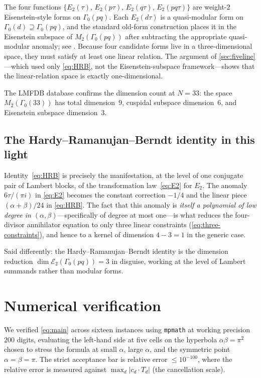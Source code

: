 \documentclass[11pt,reqno]{amsart}
\theoremstyle{definition}
\newcommand{\Eis}{\mathcal{E}}
\begin{document}
The four functions $\{E_2(\tau),\, E_2(p\tau),\, E_2(q\tau),\,
E_2(pq\tau)\}$ are weight-$2$ Eisenstein-style forms on
$\Gamma_0(pq)$. Each $E_2(d\tau)$ is a quasi-modular form on
$\Gamma_0(d) \supseteq \Gamma_0(pq)$, and the standard old-form
construction places it in the Eisenstein subspace of
$M_2(\Gamma_0(pq))$ after subtracting the appropriate quasi-modular
anomaly; see \cite[\S5.6]{DiamondShurman}. Because four candidate
forms live in a three-dimensional space, they must satisfy at least
one linear relation. The argument of \cref{sec:fiveline}---which used
only \cref{eq:HRB}, not the Eisenstein-subspace framework---shows
that the linear-relation space is exactly one-dimensional.

The LMFDB database \cite{LMFDB} confirms the dimension count at
$N = 33$: the space $M_2(\Gamma_0(33))$ has total dimension~$9$,
cuspidal subspace dimension~$6$, and Eisenstein subspace dimension~$3$.

\subsection{The Hardy--Ramanujan--Berndt identity in this light}

Identity~\eqref{eq:HRB} is precisely the manifestation, at the level
of one conjugate pair of Lambert blocks, of the transformation
law~\eqref{eq:E2} for $E_2$. The anomaly $6\tau/(\pi i)$ in
\cref{eq:E2} becomes the constant correction $-1/4$ and the linear
piece $(\alpha + \beta)/24$ in \cref{eq:HRB}. The fact that this
anomaly is \emph{itself a polynomial of low degree in
$(\alpha, \beta)$}---specifically of degree at most one---is what
reduces the four-divisor annihilator equation to only three linear
constraints (\cref{eq:three-constraints}), and hence to a kernel of
dimension $4 - 3 = 1$ in the generic case.

Said differently: the Hardy--Ramanujan--Berndt identity is the
dimension reduction $\dim \Eis_2(\Gamma_0(pq)) = 3$ in disguise,
working at the level of Lambert summands rather than modular forms.

\section{Numerical verification}\label{sec:numerical}

We verified \cref{eq:main} across sixteen instances using
\texttt{mpmath} at working precision $200$ digits, evaluating the
left-hand side at five cells on the hyperbola $\alpha\beta = \pi^2$
chosen to stress the formula at small $\alpha$, large $\alpha$, and
the symmetric point $\alpha = \beta = \pi$. The strict acceptance bar
is relative error $\le 10^{-100}$, where the relative error is
measured against $\max_d |c_d \cdot T_d|$ (the cancellation scale).
\end{document}
